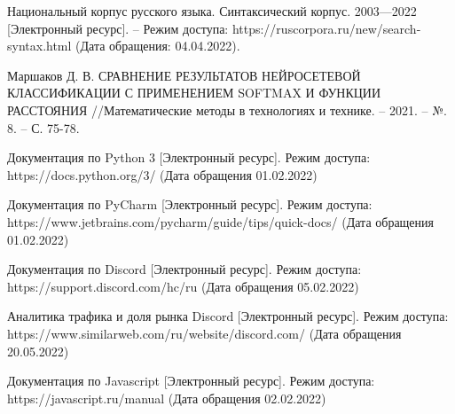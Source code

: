 \begin{thebibliography}{}
	 Национальный корпус русского языка. Синтаксический корпус. 2003—2022 [Электронный ресурс]. -- Режим доступа: https://ruscorpora.ru/new/search-syntax.html (Дата обращения: 04.04.2022).
	
	Маршаков Д. В. СРАВНЕНИЕ РЕЗУЛЬТАТОВ НЕЙРОСЕТЕВОЙ КЛАССИФИКАЦИИ С ПРИМЕНЕНИЕМ SOFTMAX И ФУНКЦИИ РАССТОЯНИЯ //Математические методы в технологиях и технике. – 2021. – №. 8. – С. 75-78.
	
	 Документация по Python 3 [Электронный ресурс]. Режим доступа: https://docs.python.org/3/ (Дата обращения 01.02.2022)
	
	 Документация по PyCharm [Электронный ресурс]. Режим доступа: https://www.jetbrains.com/pycharm/guide/tips/quick-docs/ (Дата обращения 01.02.2022)
	
	 Документация по Discord [Электронный ресурс]. Режим доступа: https://support.discord.com/hc/ru (Дата обращения 05.02.2022)
	
	 Аналитика трафика и доля рынка Discord [Электронный ресурс]. Режим доступа: https://www.similarweb.com/ru/website/discord.com/ (Дата обращения 20.05.2022)
	
	 Документация по Javascript [Электронный ресурс]. Режим доступа: https://javascript.ru/manual (Дата обращения 02.02.2022)
	
	
	
	
\end{thebibliography}
\endgroup

\pagebreak